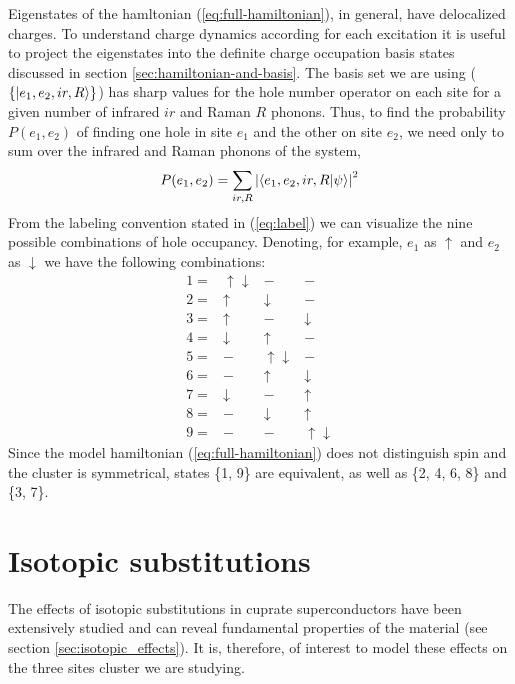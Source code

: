 Eigenstates of the hamltonian (\ref{eq:full-hamiltonian}), in general, have delocalized charges.
To understand charge dynamics according for each excitation it is useful to project the eigenstates into the definite charge occupation basis states discussed in section \ref{sec:hamiltonian-and-basis}.
The basis set we are using ($\{\left | e_1,e_2,ir,R \right\rangle\}$) has sharp values for the hole number operator on each site for a given number of infrared $ir$ and Raman $R$ phonons. 
Thus, to find the probability $P(e_1,e_2)$ of finding one hole in site $e_1$ and the other on site $e_2$, we need only to sum over the infrared and Raman phonons of the system,
%
\begin{equation}
  \label{eq:electronOccupation}
  P(e_1,e_2)=\sum_{ir,R} \left| \left\langle e_1,e_2,ir,R|\psi\right\rangle \right|^2
\end{equation}
%
From the labeling convention stated in (\ref{eq:label}) we can visualize the nine possible combinations of hole occupancy. 
Denoting, for example, $e_1$ as $\uparrow$ and $e_2$ as $\downarrow$ we have the following combinations:
%
\begin{equation}
  \label{eq:basis-set}
  \begin{array}{cccc}
    1= & \uparrow \downarrow & - & - \\
    2= & \uparrow & \downarrow & - \\
    3= & \uparrow & - & \downarrow \\
    4= & \downarrow & \uparrow & - \\
    5= & - & \uparrow \downarrow & - \\
    6= & - & \uparrow & \downarrow \\
    7= & \downarrow & - & \uparrow \\
    8= & - & \downarrow & \uparrow \\
    9= & - & - & \uparrow \downarrow 
  \end{array}
\end{equation}
%
Since the model hamiltonian (\ref{eq:full-hamiltonian}) does not distinguish spin and the cluster is symmetrical, states \{1, 9\} are equivalent, as well as \{2, 4, 6, 8\} and \{3, 7\}.

\section{Isotopic substitutions}
\label{sec:isotopic-model}

The effects of isotopic substitutions in cuprate superconductors have been extensively studied and can reveal fundamental properties of the material (see section \ref{sec:isotopic_effects}). 
It is, therefore, of interest to model these effects on the three sites cluster we are studying.

